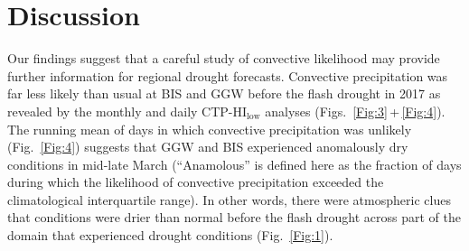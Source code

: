 \documentclass[hess, manuscript]{copernicus}
\begin{document}
\section{Discussion}
Our findings suggest that a careful study of convective likelihood may provide further information for regional drought forecasts. Convective precipitation was far less likely than usual at BIS and GGW before the flash drought in 2017 as revealed by the monthly and daily CTP-$\mathrm{HI_{low}}$ analyses (Figs.~\ref{Fig:3}\,+\,\ref{Fig:4}). The running mean of days in which convective precipitation was unlikely (Fig.~\ref{Fig:4}) suggests that GGW and BIS experienced anomalously dry conditions in mid-late March (``Anamolous'' is defined here as the fraction of days during which the likelihood of convective precipitation exceeded the climatological interquartile range). In other words, there were atmospheric clues that conditions were drier than normal before the flash drought across part of the domain that experienced drought conditions (Fig.~\ref{Fig:1}).
\end{document}
